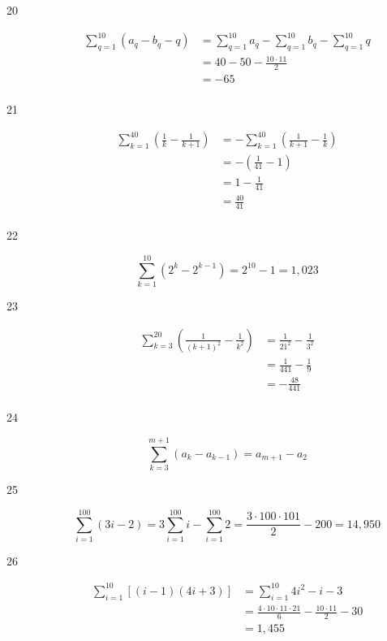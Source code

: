 \documentclass{exam}
\begin{document}
\begin{description}
\item[20]
\begin{align*}
  \sum_{q = 1}^{10} (a_q - b_q  - q) &= \sum_{q = 1}^{10} a_q - \sum_{q = 1}^{10} b_q - \sum_{q = 1}^{10} q \\
  &= 40 - 50 - \frac{10 \cdot 11}{2} \\
  &= -65 \\
\end{align*}

\item[21]
\begin{align*}
  \sum_{k = 1}^{40} \left( \frac{1}{k} - \frac{1}{k+1} \right) &= - \sum_{k = 1}^{40} \left(\frac{1}{k+1} -  \frac{1}{k} \right) \\
  &= -(\frac{1}{41} - 1) \\
  &=  1 - \frac{1}{41} \\
  &= \frac{40}{41} \\
\end{align*}

\item[22]
\[
  \sum_{k = 1}^{10} \left( 2^k - 2^{k-1} \right) = 2^{10} - 1 = 1,023
\]

\item[23]
\begin{align*}
  \sum_{k = 3}^{20} \left( \frac{1}{(k+1)^2} - \frac{1}{k^2} \right) &= \frac{1}{21^2} - \frac{1}{3^2} \\
  &= \frac{1}{441} - \frac{1}{9} \\
  &= - \frac{48}{441} \\
\end{align*}

  


\item[24]
\[
  \sum_{k = 3}^{m+1} ( a_k - a_{k-1}) = a_{m+1} - a_2
\]

\item[25]
\[
  \sum_{i = 1}^{100} (3i - 2) = 3 \sum_{i = 1}^{100} i - \sum_{i = 1}^{100} 2 = \frac{3 \cdot 100 \cdot 101}{2} - 200 = 14,950
\]

\item[26]
\begin{align*}
  \sum_{i = 1}^{10} [ (i - 1) (4i + 3) ] &= \sum_{i = 1}^{10} 4i^2 - i - 3 \\
  & = \frac{4 \cdot 10 \cdot 11 \cdot 21}{6} - \frac{10 \cdot 11}{2} - 30 \\
  &= 1,455
\end{align*}


\end{description}
\end{document}
